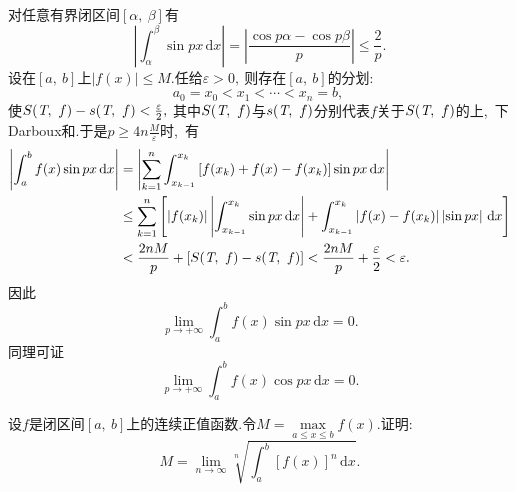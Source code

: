 	\begin{solution}
		对任意有界闭区间$\left[\alpha,\ \beta\right]$有
		$$\left|\int_{\alpha}^{\beta}\sin px\,\text{d}x\right|=\left|\frac{\cos p\alpha-\cos p\beta}{p}\right|\le\frac{2}{p}.$$
		设在$\left[a,\ b\right]$上$\left|f(x)\right|\le M.$任给$\varepsilon>0,\ $则存在$\left[a,\ b\right]$的分划:
		$$a_0=x_0<x_1<\cdots<x_n=b,\ $$
		使$S(\text{\itshape{T}},\ f)-s(\text{\itshape{T}},\ f)<\frac{\varepsilon}{2},\ $其中$S(\text{\itshape{T}},\ f)$与$s(\text{\itshape{T}},\ f)$分别代表$f$关于$S(\text{\itshape{T}},\ f)$的上,\ 下Darboux和.于是$p\ge4n\frac{M}{\varepsilon}$时,\ 有
		\begin{align*}
			\left|\int_{a}^{b}f(x)\sin px\,\text{d}x\right|&=\left|\sum\limits_{k=1}^{n}
			\int_{x_{k-1}}^{x_k}\left[f(x_k)+f(x)-f(x_k)\right]\sin px\,\text{d}x\right|\\
			&\le\sum\limits_{k=1}^{n}\left[\left|f(x_k)\right|\left|\int_{x_{k-1}}^{x_k}\sin px\,\text{d}x\right|+\int_{x_{k-1}}^{x_k}\left|f(x)-f(x_k)\right|\left|\sin px\right|\,\text{d}x\right]\\
			&<\frac{2nM}{p}+\left[S(\text{\itshape{T}},\ f)-s(\text{\itshape{T}},\ f)\right]<\frac{2nM}{p}+\frac{\varepsilon}{2}<\varepsilon.
		\end{align*}
		因此
		$$\lim\limits_{p\rightarrow+\infty}\int_{a}^{b}f(x)\sin px\,\text{d}x=0.$$
		同理可证
		$$\lim\limits_{p\rightarrow+\infty}\int_{a}^{b}f(x)\cos px\,\text{d}x=0.$$ 
	\end{solution}
	\newpage
	\begin{problem}
		设$f$是闭区间$\left[a,\ b\right]$上的连续正值函数.令$M=\max\limits_{a\le x\le b}f(x).$证明:
		$$M=\lim\limits_{n\rightarrow\infty}\sqrt[n]{\int_{a}^{b}\left[f(x)\right]^n\,\text{d}x}.$$
	\end{problem}
	

